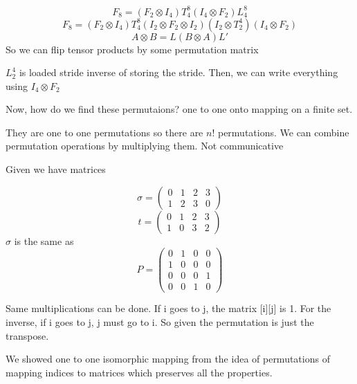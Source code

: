 \documentclass{article}
\begin{document}
		\begin{equation}
		F_{8} = (F_2 \otimes I_4)T^{8}_4(I_4 \otimes F_2) L^{8}_4
	\end{equation}
	\begin{equation}
		F_8=(F_2 \otimes I_4)T^8_4(I_2 \otimes F_2 \otimes I_2)(I_2 \otimes T^4_2)(I_4 \otimes F_2)
	\end{equation}
	\begin{equation}
		A \otimes B = L(B\otimes A)L'
	\end{equation}
	So we can flip tensor products by some permutation matrix
	
	$L^4_2$ is loaded stride inverse of storing the stride. Then, we can write everything using $I_4 \otimes F_2$
	
	Now, how do we find these permutaions? one to one onto mapping on a finite set.
	
	They are one to one permutations so there are $n!$ permutations. We can combine permutation operations by multiplying them. Not communicative
	
	Given we have matrices
	
	\begin{equation}
		\sigma = 
		\begin{pmatrix}
			0 &  1 & 2 & 3 \\
			1 & 2 & 3 & 0
		\end{pmatrix}
	\end{equation}
	\begin{equation}
		t = 
		\begin{pmatrix}
			0 &  1 & 2 & 3 \\
			1 & 0 & 3 & 2
		\end{pmatrix}
	\end{equation}
	$\sigma$ is the same as
	\begin{equation}
		P=\begin{pmatrix}
			0 & 1 & 0 & 0 \\
			1 & 0 & 0 & 0 \\
			0 & 0 & 0 & 1 \\
			0 & 0 & 1 & 0
		\end{pmatrix}
	\end{equation}
	
	Same multiplications can be done. If i goes to j, the matrix [i][j] is 1. For the inverse, if i goes to j, j must go to i. So given the permutation is just the transpose.
	
	We showed one to one isomorphic mapping from the idea of permutations of mapping indices to matrices which preserves all the properties.
	
\end{document}
